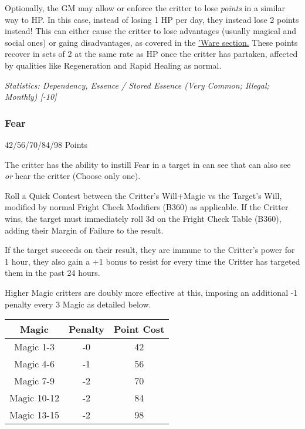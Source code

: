 \begin{multicols*}{3}
 	Optionally, the GM may allow or enforce the critter to lose \textit{points} in a similar way to HP. In this case, instead of losing 1 HP per day, they instead lose 2 points instead! This can either cause the critter to lose advantages (usually magical and social ones) or gaing disadvantages, as covered in the \hyperref[ware]{'Ware section.} These points recover in sets of 2 at the same rate as HP once the critter has partaken, affected by qualities like Regeneration and Rapid Healing as normal.
 
 	\textcolor{OliveGreen}{\textit{Statistics: Dependency, Essence / Stored Essence (Very Common; Illegal; Monthly) [-10] }}
	
	\subsubsection{Fear}\label{fear}
	\begin{flushright}
		42/56/70/84/98 Points
	\end{flushright}
	
	The critter has the ability to instill Fear in a target in can see that can also see \textit{or} hear the critter (Choose only one). 
	
	Roll a Quick Contest between the Critter's Will+Magic vs the Target's Will, modified by normal Fright Check Modifiers (B360) as applicable. If the Critter wins, the target must immediately roll 3d on the Fright Check Table (B360), adding their Margin of Failure to the result.
	
	If the target succeeds on their result, they are immune to the Critter's power for 1 hour, they also gain a +1 bonus to resist for every time the Critter has targeted them in the past 24 hours.
	
	Higher Magic critters are doubly more effective at this, imposing an additional -1 penalty every 3 Magic as detailed below.
	
	\begin{center}
		\begin{tabular}{|c|c|c|}
			\hline
			Magic & Penalty & Point Cost\\
			\hline
			\hline
			Magic 1-3 & -0 & 42 \\
			Magic 4-6 & -1 & 56 \\
			Magic 7-9 & -2 & 70 \\
			Magic 10-12 & -2 & 84 \\
			Magic 13-15 & -2 & 98 \\
			\hline
		\end{tabular}
	\end{center}
	

\end{multicols*}
